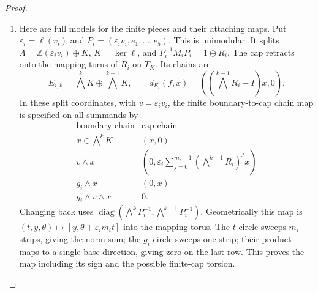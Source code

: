 \begin{proof}
\begin{enumerate}[label=\arabic*.]
\item Here are full models for the finite pieces and their attaching maps.
Put $\varepsilon_i=\ell(v_i)$ and
$P_i=(\varepsilon_iv_i,e_1,\ldots,e_5)$.
This is unimodular.  It splits
$\Lambda=\mathbb Z(\varepsilon_iv_i)\oplus K$, $K=\ker\ell$,
and $P_i^{-1}M_iP_i=1\oplus R_i$.
The cap retracts onto the mapping torus of $R_i$ on $T_K$.
Its chains are
\[
E_{i,k}=\bigwedge^kK\oplus\bigwedge^{k-1}K,
\qquad d_{E_i}(f,x)=((\bigwedge^{k-1}R_i-I)x,0).
\tag{1.12.4}
\]
In these split coordinates, with $v=\varepsilon_iv_i$, the finite
boundary-to-cap chain map is specified on all summands by
\[
\begin{array}{c|c}
\text{boundary chain}&\text{cap chain}\\\hline
x\in\bigwedge^kK&(x,0)\\
v\wedge x&(0,\varepsilon_i\sum_{j=0}^{m_i-1}
                  (\bigwedge^{k-1}R_i)^jx)\\
g_i\wedge x&(0,x)\\
g_i\wedge v\wedge x&0.
\end{array}
\tag{1.12.5}
\]
Changing back uses
$\operatorname{diag}(\bigwedge^kP_i^{-1},
\bigwedge^{k-1}P_i^{-1})$.
Geometrically this map is
$(t,y,\theta)\mapsto[y,\theta+\varepsilon_im_it]$ into the mapping
torus.  The $t$-circle sweeps $m_i$ strips, giving the norm sum; the
$g_i$-circle sweeps one strip; their product maps to a single
base direction, giving zero on the last row.  This proves the map
including its sign and the possible finite-cap torsion.


\end{enumerate}
\end{proof}
